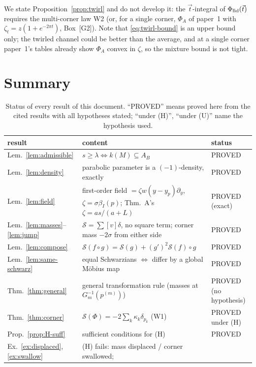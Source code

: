 \documentclass[11pt]{article}
\newcommand{\Sch}{\mathcal S}
\newcommand{\bI}{\beta_I}
\theoremstyle{definition}\newtheorem{example}[theorem]{Example}
\begin{document}
\begin{remark}
We state Proposition~\ref{prop:twirl} and do not develop it: the $\vec t$-integral of
$\Phi_{\rm fid}(\vec t)$ requires the multi-corner law W2 (or, for a single corner,
$\Phi_A$ of paper~1 with $\zeta_t=z(1+e^{-2\pi t})$, Box~[G2]).  Note that
\eqref{eq:twirl-bound} is an upper bound only; the twirled channel could be better than the
average, and at a single corner paper~1's tables already show
$\Phi_A$ convex in $\zeta$, so the mixture bound is not tight.
\end{remark}

\section{Summary}\label{sec:summary}

\begin{table}[h]\centering\small
\caption{Status of every result of this document.  ``PROVED'' means proved here from the cited
results with all hypotheses stated; ``under (H)'', ``under (U)'' name the hypothesis used.}
\label{tab:summary}
\begin{tabular}{@{}lll@{}}
\toprule
result & content & status\\
\midrule
Lem.~\ref{lem:admissible} & $s\ge\lambda\iff k(M)\subseteq A_B$ & PROVED\\
Lem.~\ref{lem:density} & parabolic parameter is a $(-1)$-density, exactly & PROVED\\
Lem.~\ref{lem:field} & first-order field $=\zeta w(y-y_p)\partial_y$, $\zeta=\sigma\bI(p)$;
 Thm.~A's $\zeta=as/(a+L)$ & PROVED (exact)\\
Lem.~\ref{lem:masses}--\ref{lem:jump} & $\Sch=\sum[v]\delta$, no square term; corner mass
 $-2\sigma$ from either side & PROVED\\
Lem.~\ref{lem:compose} & $\Sch(f\circ g)=\Sch(g)+(g')^2\Sch(f)\circ g$ & PROVED\\
Lem.~\ref{lem:same-schwarz} & equal Schwarzians $\iff$ differ by a global M\"obius map & PROVED\\
Thm.~\ref{thm:general} & general transformation rule (masses at $G_m^{-1}(p^{(m)})$) &
 PROVED (no hypothesis)\\
Thm.~\ref{thm:corner} & $\Sch(\Phi)=-2\sum_k\kappa_k\delta_{p_k}$ (W1) & PROVED under (H)\\
Prop.~\ref{prop:H-suff} & sufficient conditions for (H) & PROVED\\
Ex.~\ref{ex:displaced}, \ref{ex:swallow} & (H) fails: mass displaced / corner swallowed;

\end{tabular}
\end{table}
\end{document}
